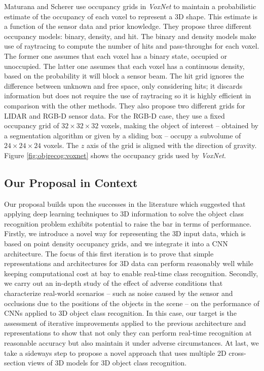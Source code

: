 Maturana and Scherer \cite{Maturana2015} use occupancy grids in \emph{VoxNet} to maintain a probabilistic estimate of the occupancy of each voxel to represent a \acs{3D} shape. This estimate is a function of the sensor data and prior knowledge. They propose three different occupancy models: binary, density, and hit. The binary and density models make use of raytracing to compute the number of hits and pass-throughs for each voxel. The former one assumes that each voxel has a binary state, occupied or unoccupied. The latter one assumes that each voxel has a continuous density, based on the probability it will block a sensor beam. The hit grid ignores the difference between unknown and free space, only considering hits; it discards information but does not require the use of raytracing so it is highly efficient in comparison with the other methods. They also propose two different grids for \ac{LIDAR} and \acs{RGB-D} sensor data. For the \acs{RGB-D} case, they use a fixed occupancy grid of $32\times32\times32$ voxels, making the object of interest -- obtained by a segmentation algorithm or given by a sliding box -- occupy a subvolume of $24\times24\times24$ voxels. The $z$ axis of the grid is aligned with the direction of gravity. Figure \ref{fig:objrecog:voxnet} shows the occupancy grids used by \emph{VoxNet}.

\subsection{Our Proposal in Context}
\label{cha:objrecog:sec:relatedworks:subsec:context}

Our proposal builds upon the successes in the literature which suggested that applying deep learning techniques to 3D information to solve the object class recognition problem exhibits potential to raise the bar in terms of performance. Firstly, we introduce a novel way for representing the \ac{3D} input data, which is based on point density occupancy grids, and we integrate it into a \ac{CNN} architecture. The focus of this first iteration is to prove that simple representations and architectures for 3D data can perform reasonably well while keeping computational cost at bay to enable real-time class recognition. Secondly, we carry out an in-depth study of the effect of adverse conditions that characterize real-world scenarios -- such as noise caused by the sensor and occlusions due to the positions of the objects in the scene -- on the performance of \acp{CNN} applied to \acs{3D} object class recognition. In this case, our target is the assessment of iterative improvements applied to the previous architecture and representations to show that not only they can perform real-time recognition at reasonable accuracy but also maintain it under adverse circumstances. At last, we take a sideways step to propose a novel approach that uses multiple \ac{2D} cross-section views of \ac{3D} models for \ac{3D} object class recognition.

